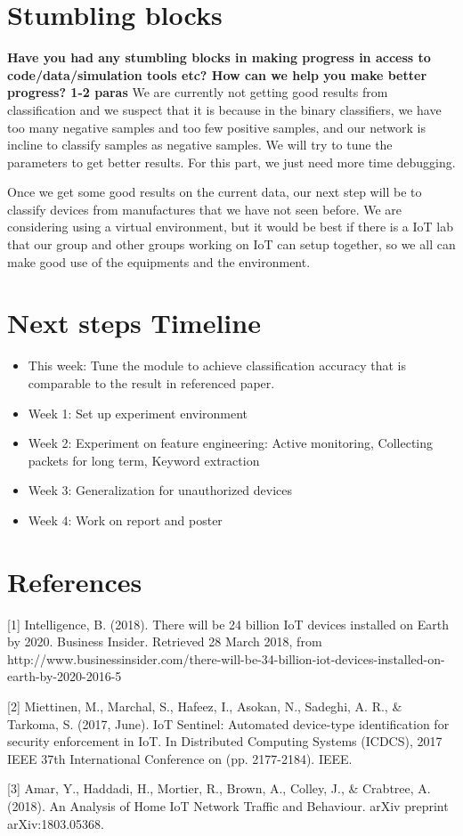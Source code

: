\documentclass[twocolumn,10pt]{article}
\begin{document}
\section{Stumbling blocks}

{\bf Have you had any stumbling blocks in making progress in access to code/data/simulation tools etc? How can we help you make better progress? 1-2 paras}
We are currently not getting good results from classification and we suspect that it is because in the binary classifiers, we have too many negative samples and too few positive samples, and our network is incline to classify samples as negative samples. We will try to tune the parameters to get better results. For this part, we just need more time debugging.

Once we get some good results on the current data, our next step will be to classify devices from manufactures that we have not seen before. We are considering using a virtual environment, but it would be best if there is a IoT lab that our group and other groups working on IoT can setup together, so we all can make good use of the equipments and the environment.

\section{Next steps  Timeline}

\begin{itemize}
   \item This week: Tune the module to achieve classification accuracy that is comparable to the result in referenced paper.
   \item Week 1: Set up experiment environment 
   \item Week 2: Experiment on feature engineering: Active monitoring, Collecting packets for long term, Keyword extraction
   \item Week 3: Generalization for unauthorized devices
   \item Week 4: Work on report and poster
\end{itemize}

\section{References}

[1] Intelligence, B. (2018). There will be 24 billion IoT devices installed on Earth by 2020. Business Insider. Retrieved 28 March 2018, from http://www.businessinsider.com/there-will-be-34-billion-iot-devices-installed-on-earth-by-2020-2016-5

[2] Miettinen, M., Marchal, S., Hafeez, I., Asokan, N., Sadeghi, A. R., \& Tarkoma, S. (2017, June). IoT Sentinel: Automated device-type identification for security enforcement in IoT. In Distributed Computing Systems (ICDCS), 2017 IEEE 37th International Conference on (pp. 2177-2184). IEEE.

[3] Amar, Y., Haddadi, H., Mortier, R., Brown, A., Colley, J., \& Crabtree, A. (2018). An Analysis of Home IoT Network Traffic and Behaviour. arXiv preprint arXiv:1803.05368.

{
\footnotesize
\raggedright


}

%
\end{document}
